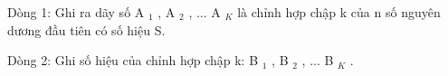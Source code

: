 Dòng 1: Ghi ra dãy số A   $_    1   $   , A   $_    2   $   , ... A   $_    K   $   là chỉnh hợp chập k của n số nguyên dương đầu tiên có số hiệu S.  

   Dòng 2: Ghi số hiệu của chỉnh hợp chập k: B   $_    1   $   , B   $_    2   $   , ... B   $_    K   $   .
